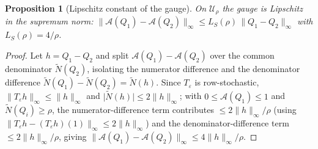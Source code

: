 \documentclass[11pt]{article}
\theoremstyle{plain}
\newtheorem{proposition}[theorem]{Proposition}
\theoremstyle{definition}
\theoremstyle{remark}
\newcommand{\Ac}{\mathcal A}
\begin{document}
\begin{proposition}[Lipschitz constant of the gauge]\label{prop:lipschitz}
On $\mathcal U_\rho$ the gauge is Lipschitz in the supremum norm: $\lVert\Ac(Q_1)-\Ac(Q_2)\rVert_\infty\le L_S(\rho)\,\lVert Q_1-Q_2\rVert_\infty$ with $L_S(\rho)=4/\rho$.
\end{proposition}
\begin{proof}
Let $h=Q_1-Q_2$ and split $\Ac(Q_1)-\Ac(Q_2)$ over the common denominator $\tilde N(Q_2)$, isolating the numerator difference and the denominator difference $\tilde N(Q_1)-\tilde N(Q_2)=\tilde N(h)$. Since $T_\varepsilon$ is row-stochastic, $\lVert T_\varepsilon h\rVert_\infty\le\lVert h\rVert_\infty$ and $\lvert\tilde N(h)\rvert\le2\lVert h\rVert_\infty$; with $0\le\Ac(Q_1)\le1$ and $\tilde N(Q_i)\ge\rho$, the numerator-difference term contributes $\le2\lVert h\rVert_\infty/\rho$ (using $\lVert T_\varepsilon h-(T_\varepsilon h)(1)\rVert_\infty\le2\lVert h\rVert_\infty$) and the denominator-difference term $\le2\lVert h\rVert_\infty/\rho$, giving $\lVert\Ac(Q_1)-\Ac(Q_2)\rVert_\infty\le 4\lVert h\rVert_\infty/\rho$.
\end{proof}
\end{document}
